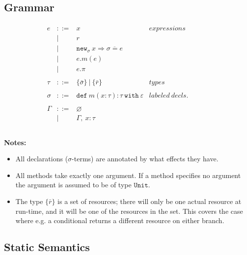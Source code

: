 \documentclass{llncs}
\newcommand{\keywadj}[1]{\mathtt{#1}}
\newcommand{\keyw}[1]{\keywadj{#1}~}
\newcommand{\newsig}[0]{
	\keywadj{new}_\sigma~x \Rightarrow \overline{\sigma = e}
}
\begin{document}
\subsection{Grammar}

\[
\begin{array}{lll}
\begin{array}{lllr}

	e & ::= & x & expressions \\
  		& | & r \\
  		& | & \newsig \\
  		& | & e.m(e)\\
  		& | & e.\pi\\
		&&\\

	\tau & ::= & \{ \bar \sigma \} ~ | ~ \{ \bar r \} & types \\
		&&\\

	\sigma & ::= &  \keyw{def} m(x:\tau):\tau~\keyw{with}\varepsilon  & labeled~ decls.\\
		&&\\
		
	\Gamma & ::= & \varnothing \\
		& | & \Gamma,~x : \tau\\
		&&\\

\end{array}
& ~~~~~~
&
\end{array}
\]


\noindent \textbf{Notes:}

\begin{itemize}
	\item All declarations ($\sigma$-terms) are annotated by what effects they have.
	\item All methods take exactly one argument. If a method specifies no argument the argument is assumed to be of type $\keywadj{Unit}$.
	\item The type $\{ \bar r \}$ is a set of resources; there will only be one actual resource at run-time, and it will be one of the resources in the set. This covers the case where e.g. a conditional returns a different resource on either branch.
\end{itemize}

\subsection{Static Semantics}
\end{document}
